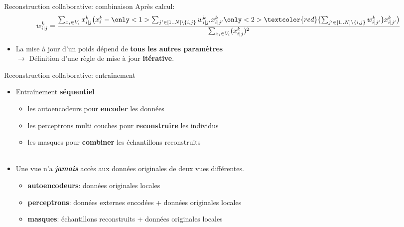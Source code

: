 \documentclass[hyperref={pdfpagelabels=false}]{beamer}
\begin{document}
    \begin{frame}{Reconstruction collaborative: combinaison}
        Après calcul:
        \begin{equation*}
            w_{i|j}^k = \frac{\sum_{x_i \in V_i} x_{i|j}^k\big(x_i^k - 
            \only<1>{\sum_{j'\in[1..N]\backslash \{i,j\}} w_{i|j'}^k x_{i|j'}^k}
            \only<2>{\textcolor{red}{\sum_{j'\in[1..N]\backslash \{i,j\}} w_{i|j'}^k} x_{i|j'}^k}
            \big)}{\sum_{x_i \in V_i}(x_{i|j}^k)^2}
        \end{equation*}
        \begin{itemize}
            \item<2> La mise à jour d'un poids dépend de \textbf{tous les autres 
                paramètres}\\$\rightarrow$ Définition d'une règle de mise à jour 
                \textbf{itérative}.
        \end{itemize}
    \end{frame}

    \begin{frame}{Reconstruction collaborative: entraînement}
        \begin{itemize}
            \item Entraînement \textbf{séquentiel}
                \begin{itemize}
                    \item les autoencodeurs pour \textbf{encoder} les données
                    \item les perceptrons multi couches pour 
                        \textbf{reconstruire} les individus
                    \item les masques pour \textbf{combiner} les échantillons 
                        reconstruits\\~\\
                \end{itemize}
            \item Une vue n'a \textbf{\textit{jamais}} accès aux données 
                originales de deux vues différentes.
                \begin{itemize}
                    \item \textbf{autoencodeurs}: données originales locales
                    \item \textbf{perceptrons}: données externes encodées + 
                        données originales locales
                    \item \textbf{masques}: échantillons reconstruits + données 
                        originales locales
                \end{itemize}
        \end{itemize}
    \end{frame}
\end{document}
